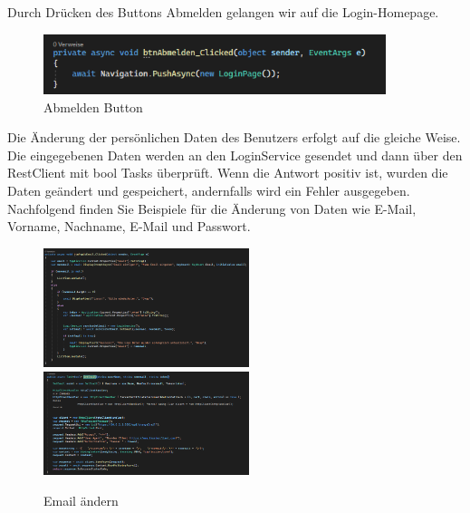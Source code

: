 \newline
Durch Drücken des Buttons Abmelden gelangen wir auf die Login-Homepage.
\begin{figure}[h]
    \begin{center}\includegraphics[width=10cm]{pics/Xamarin Frontend/abmelden.png}
    \caption[MyAccount]{Abmelden Button}
    \end{center}
\end{figure}
\newpage
Die Änderung der persönlichen Daten des Benutzers erfolgt auf die gleiche Weise. Die eingegebenen Daten werden an den LoginService gesendet und dann über den RestClient mit bool Tasks überprüft. Wenn die Antwort positiv ist, wurden die Daten geändert und gespeichert, andernfalls wird ein Fehler ausgegeben.
\newline
Nachfolgend finden Sie Beispiele für die Änderung von Daten wie E-Mail, Vorname, Nachname, E-Mail und Passwort.
\begin{figure}[h]
    \begin{center}
    \includegraphics[width=6cm]{pics/Xamarin Frontend/email1.png}\hfill
    \includegraphics[width=6cm]{pics/Xamarin Frontend/email2.png}
    \caption[MyAccount]{Email ändern}
    \end{center}
\end{figure}
